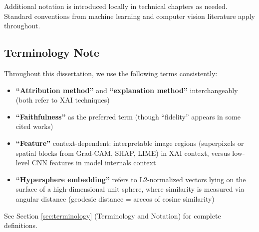 Additional notation is introduced locally in technical chapters as needed. Standard conventions from machine learning and computer vision literature apply throughout.

\subsection{Terminology Note}

Throughout this dissertation, we use the following terms consistently:
\begin{itemize}
\item \textbf{``Attribution method''} and \textbf{``explanation method''} interchangeably (both refer to XAI techniques)
\item \textbf{``Faithfulness''} as the preferred term (though ``fidelity'' appears in some cited works)
\item \textbf{``Feature''} context-dependent: interpretable image regions (superpixels or spatial blocks from Grad-CAM, SHAP, LIME) in XAI context, versus low-level CNN features in model internals context
\item \textbf{``Hypersphere embedding''} refers to L2-normalized vectors lying on the surface of a high-dimensional unit sphere, where similarity is measured via angular distance (geodesic distance = arccos of cosine similarity)
\end{itemize}

See Section \ref{sec:terminology} (Terminology and Notation) for complete definitions.
